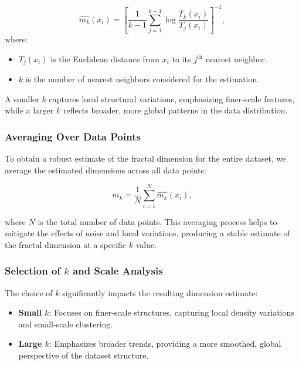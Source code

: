 \documentclass{article}
\theoremstyle{plain}
\theoremstyle{definition}
\theoremstyle{remark}
\begin{document}
\begin{equation}
\hat{m_k}(x_i) = \left[\frac{1}{k-1} \sum_{j=1}^{k-1} \log \frac{T_k(x_i)}{T_j(x_i)}\right]^{-1},
\end{equation}
where:

\begin{itemize}
    \item $T_j(x_i)$ is the Euclidean distance from $x_i$ to its $j^{\text{th}}$ nearest neighbor.
    \item $k$ is the number of nearest neighbors considered for the estimation.
\end{itemize}

A smaller $k$ captures local structural variations, emphasizing finer-scale features, while a larger $k$ reflects broader, more global patterns in the data distribution.

\subsubsection{Averaging Over Data Points}

To obtain a robust estimate of the fractal dimension for the entire dataset, we average the estimated dimensions across all data points:

\begin{equation}
\bar{m_k} = \frac{1}{N} \sum_{i=1}^N \hat{m_k}(x_i),
\end{equation}

where $N$ is the total number of data points. This averaging process helps to mitigate the effects of noise and local variations, producing a stable estimate of the fractal dimension at a specific $k$ value.

\subsubsection{Selection of $k$ and Scale Analysis}

The choice of $k$ significantly impacts the resulting dimension estimate:

\begin{itemize}
    \item \textbf{Small $k$}: Focuses on finer-scale structures, capturing local density variations and small-scale clustering.
    \item \textbf{Large $k$}: Emphasizes broader trends, providing a more smoothed, global perspective of the dataset structure.
\end{itemize}
\end{document}
